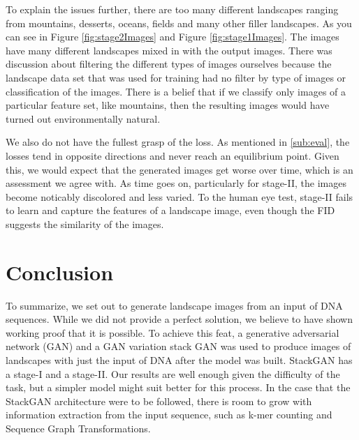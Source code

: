 \documentclass{article}
\begin{document}
	To explain the issues further, there are too many different landscapes ranging from mountains, desserts, oceans, fields and many other filler landscapes. As you can see in Figure  \ref{fig:stage2Images} and Figure \ref{fig:stage1Images}. The images have many different landscapes mixed in with the output images. There was discussion about filtering the different types of images ourselves because the landscape data set that was used for training had no filter by type of images or classification of the images. There is a belief that if we classify only images of a particular feature set, like mountains, then the resulting images would have turned out environmentally natural.

	We also do not have the fullest grasp of the loss. As mentioned in \ref{sub:eval}, the losses tend in opposite directions and never reach an equilibrium point. Given this, we would expect that the generated images get worse over time, which is an assessment we agree with. As time goes on, particularly for stage-II, the images become noticably discolored and less varied. To the human eye test, stage-II fails to learn and capture the features of a landscape image, even though the FID suggests the similarity of the images.


	\section{Conclusion}

	 To summarize, we set out to generate landscape images from an input of DNA sequences. While we did not provide a perfect solution, we believe to have shown working proof that it is possible. To achieve this feat, a generative adversarial network (GAN) and a GAN variation stack GAN was used to produce images of landscapes with just the input of DNA after the model was built. StackGAN has a stage-I and a stage-II. Our results are well enough given the difficulty of the task, but a simpler model might suit better for this process. In the case that the StackGAN architecture were to be followed, there is room to grow with information extraction from the input sequence, such as k-mer counting and Sequence Graph Transformations.
\end{document}
